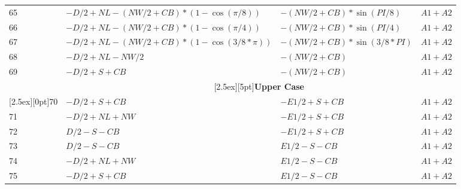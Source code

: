 \documentclass[a4paper]{article}
\begin{document}
\begin{longtable}{|l|l|l|l|}
65 & $-D/2 + NL - (NW/2 + CB)*(1-\cos(\pi/8))$   & $-(NW/2 + CB)*\sin(PI/8)$   & $A1+A2$\\
66 & $-D/2 + NL - (NW/2 + CB)*(1-\cos(\pi/4))$   & $-(NW/2 + CB)*\sin(PI/4)$   & $A1+A2$\\
67 & $-D/2 + NL - (NW/2 + CB)*(1-\cos(3/8*\pi))$ & $-(NW/2 + CB)*\sin(3/8*PI)$ & $A1+A2$\\
68 & $-D/2 + NL - NW/2$                          & $-(NW/2 + CB)$              & $A1+A2$\\
69 & $-D/2 + S + CB$                             & $-(NW/2 + CB)$              & $A1+A2$\\
\hline
&\multicolumn{3}{|c|}{\raisebox{0pt}[2.5ex][5pt]{\textbf{Upper Case}}}\\\cline{2-4}
\raisebox{0pt}[2.5ex][0pt]{70}
   & $-D/2 + S + CB$  & $-E1/2 + S + CB$ & $A1+A2$\\
71 & $-D/2 + NL + NW$ & $-E1/2 + S + CB$ & $A1+A2$\\
72 & $D/2 - S - CB$   & $-E1/2 + S + CB$ & $A1+A2$\\
73 & $D/2 - S - CB$   & $E1/2 - S - CB$  & $A1+A2$\\
74 & $-D/2 + NL + NW$ & $E1/2 - S - CB$  & $A1+A2$\\
75 & $-D/2 + S + CB$  & $E1/2 - S - CB$  & $A1+A2$\\
\hline
\end{longtable}
\end{document}
